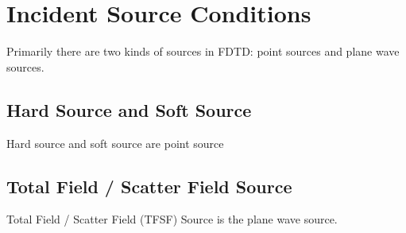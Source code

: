 \section{Incident Source Conditions}
Primarily there are two kinds of sources in FDTD: point sources and plane wave sources.
\subsection{Hard Source and Soft Source}
Hard source and soft source are point source
\subsection{Total Field / Scatter Field Source}
Total Field / Scatter Field (TFSF) Source is the plane wave source.
